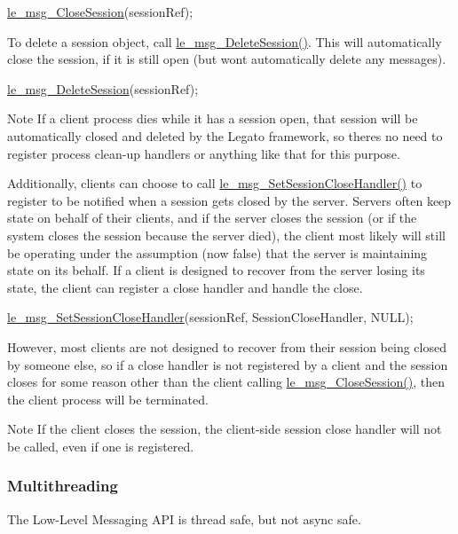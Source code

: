 \begin{DoxyCode}
\hyperlink{le__messaging_8h_a1af0671de74160d99be5bfe212c39369}{le\_msg\_CloseSession}(sessionRef);
\end{DoxyCode}


To delete a session object, call \hyperlink{le__messaging_8h_a8d950c4b07741177d2c0927c31e3e29f}{le\+\_\+msg\+\_\+\+Delete\+Session()}. This will automatically close the session, if it is still open (but won\textquotesingle{}t automatically delete any messages).


\begin{DoxyCode}
\hyperlink{le__messaging_8h_a8d950c4b07741177d2c0927c31e3e29f}{le\_msg\_DeleteSession}(sessionRef);
\end{DoxyCode}


\begin{DoxyNote}{Note}
If a client process dies while it has a session open, that session will be automatically closed and deleted by the Legato framework, so there\textquotesingle{}s no need to register process clean-\/up handlers or anything like that for this purpose.
\end{DoxyNote}
Additionally, clients can choose to call \hyperlink{le__messaging_8h_a981b1b0714abba85efc19293ac6d2744}{le\+\_\+msg\+\_\+\+Set\+Session\+Close\+Handler()} to register to be notified when a session gets closed by the server. Servers often keep state on behalf of their clients, and if the server closes the session (or if the system closes the session because the server died), the client most likely will still be operating under the assumption (now false) that the server is maintaining state on its behalf. If a client is designed to recover from the server losing its state, the client can register a close handler and handle the close.


\begin{DoxyCode}
\hyperlink{le__messaging_8h_a981b1b0714abba85efc19293ac6d2744}{le\_msg\_SetSessionCloseHandler}(sessionRef, SessionCloseHandler, NULL);
\end{DoxyCode}


However, most clients are not designed to recover from their session being closed by someone else, so if a close handler is not registered by a client and the session closes for some reason other than the client calling \hyperlink{le__messaging_8h_a1af0671de74160d99be5bfe212c39369}{le\+\_\+msg\+\_\+\+Close\+Session()}, then the client process will be terminated.

\begin{DoxyNote}{Note}
If the client closes the session, the client-\/side session close handler will not be called, even if one is registered.
\end{DoxyNote}
\hypertarget{c_messaging_c_messagingClientMultithreading}{}\subsubsection{Multithreading}\label{c_messaging_c_messagingClientMultithreading}
The Low-\/\+Level Messaging A\+P\+I is thread safe, but not async safe.

